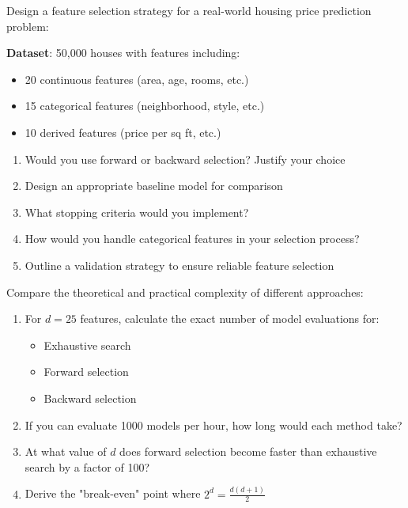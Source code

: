 \documentclass{article}
\newcounter{exercise}
\begin{document}
\begin{tcolorbox}[colback=blue!5!white,colframe=blue!75!black,title=\textbf{Exercise \theexercise: Real-World Application Design}]
Design a feature selection strategy for a real-world housing price prediction problem:

\textbf{Dataset}: 50,000 houses with features including:
\begin{itemize}
    \item 20 continuous features (area, age, rooms, etc.)
    \item 15 categorical features (neighborhood, style, etc.) 
    \item 10 derived features (price per sq ft, etc.)
\end{itemize}

\begin{enumerate}[label=(\alph*)]
    \item Would you use forward or backward selection? Justify your choice
    \item Design an appropriate baseline model for comparison
    \item What stopping criteria would you implement?
    \item How would you handle categorical features in your selection process?
    \item Outline a validation strategy to ensure reliable feature selection
\end{enumerate}
\end{tcolorbox}

\begin{tcolorbox}[colback=blue!5!white,colframe=blue!75!black,title=\textbf{Exercise \theexercise: Advanced Complexity Analysis}]
Compare the theoretical and practical complexity of different approaches:

\begin{enumerate}[label=(\alph*)]
    \item For $d = 25$ features, calculate the exact number of model evaluations for:
    \begin{itemize}
        \item Exhaustive search
        \item Forward selection  
        \item Backward selection
    \end{itemize}
    \item If you can evaluate 1000 models per hour, how long would each method take?
    \item At what value of $d$ does forward selection become faster than exhaustive search by a factor of 100?
    \item Derive the "break-even" point where $2^d = \frac{d(d+1)}{2}$
\end{enumerate}
\end{tcolorbox}
\end{document}
